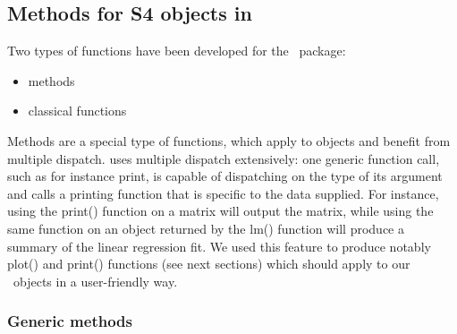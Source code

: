 \subsection{Methods for S4 objects in \monolix}

Two types of functions have been developed for the \monolix~package:
\begin{itemize}
\item methods
\item classical functions
\end{itemize}
Methods are a special type of functions, which apply to objects and benefit from multiple dispatch. \R uses multiple dispatch extensively: one generic function call, such as for instance {\sf print}, is capable of dispatching on the type of its argument and calls a printing function that is specific to the data supplied. For instance, using the {\sf print()} function on a matrix will output the matrix, while using the same function on an object returned by the {\sf lm()} function will produce a summary of the linear regression fit. We used this feature to produce notably {\sf plot()} and {\sf print()} functions (see next sections) which should apply to our \monolix~objects in a user-friendly way.

\subsubsection{Generic methods}

